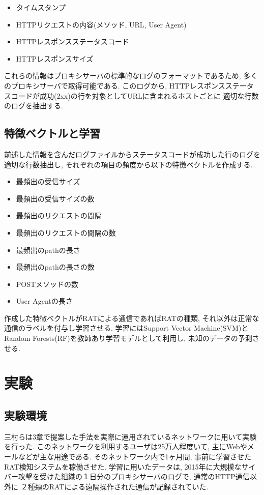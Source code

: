 \documentclass[twocolumn,10pt]{ltjsarticle}
\begin{document}
\begin{itemize}
    \item タイムスタンプ
    \item HTTPリクエストの内容(メソッド, URL, User Agent)
    \item HTTPレスポンスステータスコード
    \item HTTPレスポンスサイズ
\end{itemize}

これらの情報はプロキシサーバの標準的なログのフォーマットであるため, 多くのプロキシサーバで取得可能である. 
このログから, HTTPレスポンスステータスコードが成功(2xx)の行を対象としてURLに含まれるホストごとに
適切な行数のログを抽出する. 

\subsection{特徴ベクトルと学習}
前述した情報を含んだログファイルからステータスコードが成功した行のログを適切な行数抽出し, 
それぞれの項目の頻度から以下の特徴ベクトルを作成する. 

\begin{itemize}
    \item 最頻出の受信サイズ
    \item 最頻出の受信サイズの数
    \item 最頻出のリクエストの間隔
    \item 最頻出のリクエストの間隔の数
    \item 最頻出のpathの長さ
    \item 最頻出のpathの長さの数
    \item POSTメソッドの数
    \item User Agentの長さ
\end{itemize}

作成した特徴ベクトルがRATによる通信であればRATの種類, それ以外は正常な通信のラベルを付与し学習させる. 
学習にはSupport Vector Machine(SVM)とRandom Forests(RF)を教師あり学習モデルとして利用し, 
未知のデータの予測させる. 

\section{実験}
\subsection{実験環境}
三村らは3章で提案した手法を実際に運用されているネットワークに用いて実験を行った. 
このネットワークを利用するユーザは25万人程度いて, 主にWebやメールなどが主な用途である. 
そのネットワーク内で1ヶ月間, 事前に学習させたRAT検知システムを稼働させた. 学習に用いたデータは, 
2015年に大規模なサイバー攻撃を受けた組織の１日分のプロキシサーバのログで, 通常のHTTP通信以外に
２種類のRATによる遠隔操作された通信が記録されていた. 
\end{document}

